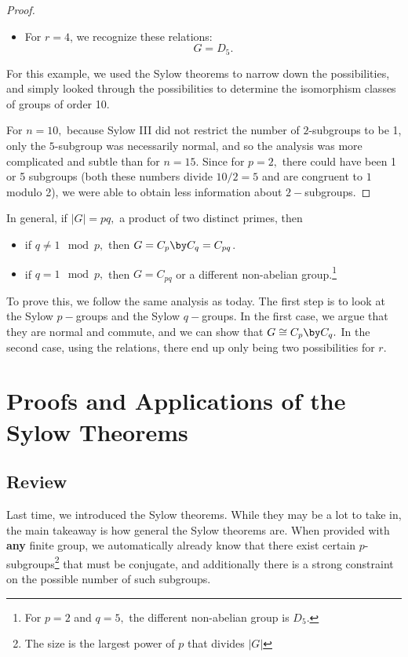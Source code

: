 \begin{proof}
\begin{itemize}
    \item For $r = 4$, we recognize these relations: \[G = D_5.\]

\end{itemize}

For this example, we used the Sylow theorems to narrow down the possibilities, and simply looked through the possibilities to determine the isomorphism classes of groups of order 10. 

For $n = 10,$ because Sylow III did not restrict the number of $2$-subgroups to be 1, only the $5$-subgroup was necessarily normal, and so the analysis was more complicated and subtle than for $n = 15$. Since for $p = 2,$ there could have been 1 or 5 subgroups (both these numbers divide $10/2 = 5$ and are congruent to $1$ modulo 2), we were able to obtain less information about $2-$subgroups. 

\end{proof}

In general, if $|G| = pq,$ a product of two distinct primes, then 
\begin{itemize}
    \item if $q \neq 1 \mod p,$ then $G = C_p \by C_q = C_{pq}$.
    
    \item if $q = 1 \mod p,$ then $G = C_{pq}$ or a different non-abelian group.\footnote{For $p = 2$ and $q = 5,$ the different non-abelian group is $D_5.$}

\end{itemize}
To prove this, we follow the same analysis as today. The first step is to look at the Sylow $p-$groups and the Sylow $q-$groups. In the first case, we argue that they are normal and commute, and we can show that $G \cong C_p \by C_q.$ In the second case, using the relations, there end up only being two possibilities for $r.$

\newpage


\section{Proofs and Applications of the Sylow Theorems}
\subsection{Review}
Last time, we introduced the Sylow theorems. While they may be a lot to take in, the main takeaway is how general the Sylow theorems are. When provided with \textbf{any} finite group, we automatically already know that there exist certain $p$-subgroups\footnote{The size is the largest power of $p$ that divides $|G|$} that must be conjugate, and additionally there is a strong constraint on the possible number of such subgroups.

